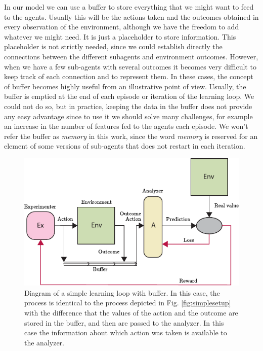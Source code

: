 \documentclass[11pt,a4paper,twoside]{report}
\newcommand{\+}{\textnormal{+} }
\theoremstyle{definition}
\numberwithin{equation}{chapter}
\begin{document}
In our model we can use a buffer to store everything that we might want to feed
to the agents. Usually this will be the actions taken and the outcomes obtained
in every observation of the environment, although we have the freedom to add
whatever we might need. It is just a placeholder to store information. This
placeholder is not strictly needed, since we could establish directly the
connections between the different subagents and environment outcomes. However,
when we have a few sub-agents with several outcomes it becomes very difficult to
keep track of each connection and to represent them. In these cases, the concept
of buffer becomes highly useful from an illustrative point of view. Usually, the
buffer is emptied at the end of each episode or iteration of the learning loop.
We could not do so, but in practice, keeping the data in the buffer does not
provide any easy advantage since to use it we should solve many challenges, for
example an increase in the number of features fed to the agents each episode.
We won't refer the buffer as \textit{memory} in this work, since the word
\textit{memory} is reserved for an element of some versions of sub-agents that
does not restart in each iteration. 


\begin{figure}
  \centering
  \includegraphics{figures/SimpleSetUp(Buffer).pdf}
  \caption{Diagram of a simple learning loop with buffer. In this case, the
  process is identical to the process depicted in Fig. \ref{fig:simplesetup}
  with the difference that the values of the action and the outcome are stored
  in the buffer, and then are passed to the analyzer. In this case the
  information about which action was taken is available to the analyzer.} 
  \label{fig:simplesetupbuffer}
\end{figure}
\end{document}
